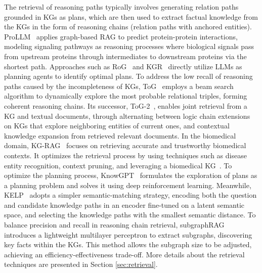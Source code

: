 \documentclass[lettersize,journal]{IEEEtran}
\begin{document}
The retrieval of reasoning paths typically involves generating relation paths grounded in KGs as plans, which are then used to extract factual knowledge from the KGs in the form of reasoning chains (relation paths with anchored entities). 
ProLLM~\cite{jin2024prollm} applies graph-based RAG to predict protein-protein interactions, modeling signaling pathways as reasoning processes where biological signals pass from upstream proteins through intermediates to downstream proteins via the shortest path.
Approaches such as RoG~\cite{luo2024reasoning} and KGR~\cite{guan2024mitigating} directly utilize LLMs as planning agents to identify optimal plans. To address the low recall of reasoning paths caused by the incompleteness of KGs, ToG~\cite{sun2024thinkongraph} employs a beam search algorithm to dynamically explore the most probable relational triples, forming coherent reasoning chains. Its successor, ToG-2~\cite{ma2024think-on-graph-2.0}, enables joint retrieval from a KG and textual documents, through alternating between logic chain extensions on KGs that explore neighboring entities of current ones, and contextual knowledge expansion from retrieved relevant documents.
In the biomedical domain, KG-RAG~\cite{soman2023biomedical} focuses on retrieving accurate and trustworthy biomedical contexts. It optimizes the retrieval process by using techniques such as disease entity recognition, context pruning, and leveraging a biomedical KG~\cite{SPOKE-biometicKG}. 
To optimize the planning process, KnowGPT~\cite{Zhang-etal24KnowGPT} formulates the exploration of plans as a planning problem and solves it using deep reinforcement learning. Meanwhile, KELP~\cite{liu2024knowledge} adopts a simpler semantic-matching strategy, encoding both the question and candidate knowledge paths in an encoder fine-tuned on a latent semantic space, and selecting the knowledge paths with the smallest semantic distance. To balance precision and recall in reasoning chain retrieval, subgraphRAG~\cite{li2024simple} introduces a lightweight multilayer perceptron to extract subgraphs, discovering key facts within the KGs. This method allows the subgraph size to be adjusted, achieving an efficiency-effectiveness trade-off. More details about the retrieval techniques are presented in Section \ref{sec:retrieval}.
\end{document}
